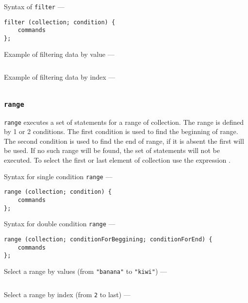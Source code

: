 Syntax of \texttt{filter} —
\begin{verbatim}
filter (collection; condition) {
	commands
};
\end{verbatim}

Example of filtering data by value —
\inputminted[linenos]{icl}{../sources/filterdataex.icL}

Example of filtering data by index —
\inputminted[linenos]{icl}{../sources/filterindexex.icL}

\subsubsection{\texttt{range}}

\texttt{range} executes a set of statements for a range of collection. The range is defined by 1 or 2 conditions. The first condition is used to find the beginning of range. The second condition is used to find the end of range, if it is absent the first will be used. If no such range will be found, the set of statements will not be executed. To select the first or last element of collection use the expression \true{}.

Syntax for single condition \texttt{range} —
\begin{verbatim}
range (collection; condition) {
	commands
};
\end{verbatim}

Syntax for double condition \texttt{range} —
\begin{verbatim}
range (collection; conditionForBeggining; conditionForEnd) {
	commands
};
\end{verbatim}

Select a range by values (from \texttt{"banana"} to \texttt{"kiwi"}) —
\inputminted[linenos]{icl}{../sources/bananakiwiex.icL}

Select a range by index (from \texttt{2} to last) —
\inputminted[linenos]{icl}{../sources/seclastex.icL}
